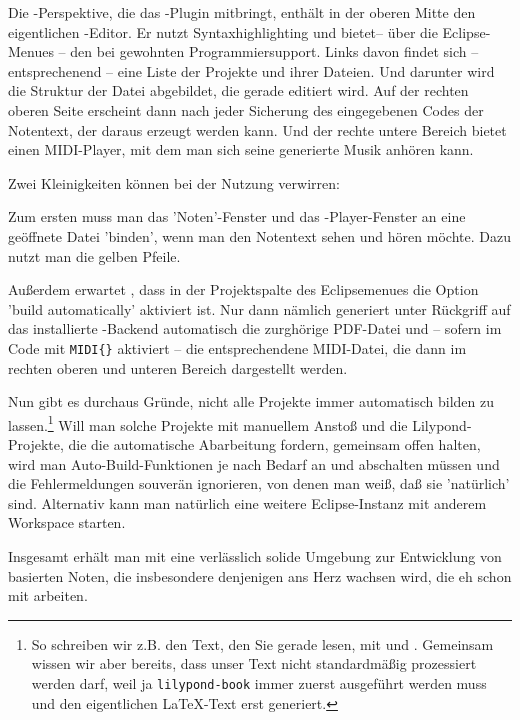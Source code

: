 Die -Perspektive, die das -Plugin mitbringt, enthält
in der oberen Mitte den eigentlichen -Editor. Er nutzt
Syntaxhighlighting und bietet-- über die Eclipse-Menues -- den bei 
gewohnten Programmiersupport. Links davon findet sich -- entsprechenend -- eine
Liste der Projekte und ihrer Dateien. Und darunter wird die Struktur der Datei
abgebildet, die gerade editiert wird. Auf der rechten oberen Seite erscheint
dann nach jeder Sicherung des eingegebenen Codes der Notentext, der daraus
erzeugt werden kann. Und der rechte untere Bereich bietet einen MIDI-Player, mit
dem man sich seine generierte Musik anhören kann.

Zwei Kleinigkeiten können bei der Nutzung verwirren: 

Zum ersten muss man das 'Noten'-Fenster und das -Player-Fenster an
eine geöffnete Datei 'binden', wenn man den Notentext sehen und hören möchte.
Dazu nutzt man die gelben Pfeile.

Außerdem erwartet , dass in der Projektspalte des Eclipsemenues die
Option 'build automatically' aktiviert ist. Nur dann nämlich generiert
 unter Rückgriff auf das installierte -Backend
automatisch die zurghörige PDF-Datei und -- sofern im Code mit \texttt{MIDI\{\}}
aktiviert -- die entsprechendene MIDI-Datei, die dann im rechten oberen und
unteren Bereich dargestellt werden.

Nun gibt es durchaus Gründe, nicht alle Projekte immer automatisch bilden zu
lassen.\footnote{So schreiben wir z.B. den Text, den Sie gerade lesen, mit
 und . Gemeinsam wissen wir aber bereits, dass unser
Text nicht standardmäßig prozessiert werden darf, weil ja \texttt{lilypond-book}
immer zuerst ausgeführt werden muss und den eigentlichen \LaTeX-Text erst
generiert.} Will man solche Projekte mit manuellem Anstoß und die
Lilypond-Projekte, die die automatische Abarbeitung fordern, gemeinsam offen
halten, wird man Auto-Build-Funktionen je nach Bedarf an und abschalten müssen
und die Fehlermeldungen souverän ignorieren, von denen man weiß, daß sie
'natürlich' sind. Alternativ kann man natürlich eine weitere Eclipse-Instanz mit
anderem Workspace starten.

Insgesamt erhält man mit  eine verlässlich solide Umgebung zur
Entwicklung von  basierten Noten, die insbesondere denjenigen ans
Herz wachsen wird, die eh schon mit  arbeiten.

% 
